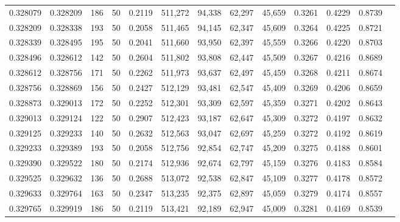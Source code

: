 \begin{tabular}{rrrrrrrrrrrrr}
0.328079 & 0.328209 &   186 &  50 &                                     0.2119 & 511,272 &  94,338 &  62,297 &  45,659 & 0.3261 & 0.4229 & 0.8739 \\
0.328209 & 0.328338 &   193 &  50 &                                     0.2058 & 511,465 &  94,145 &  62,347 &  45,609 & 0.3264 & 0.4225 & 0.8721 \\
0.328339 & 0.328495 &   195 &  50 &                                     0.2041 & 511,660 &  93,950 &  62,397 &  45,559 & 0.3266 & 0.4220 & 0.8703 \\
0.328496 & 0.328612 &   142 &  50 &                                     0.2604 & 511,802 &  93,808 &  62,447 &  45,509 & 0.3267 & 0.4216 & 0.8689 \\
0.328612 & 0.328756 &   171 &  50 &                                     0.2262 & 511,973 &  93,637 &  62,497 &  45,459 & 0.3268 & 0.4211 & 0.8674 \\
0.328756 & 0.328869 &   156 &  50 &                                     0.2427 & 512,129 &  93,481 &  62,547 &  45,409 & 0.3269 & 0.4206 & 0.8659 \\
0.328873 & 0.329013 &   172 &  50 &                                     0.2252 & 512,301 &  93,309 &  62,597 &  45,359 & 0.3271 & 0.4202 & 0.8643 \\
0.329013 & 0.329124 &   122 &  50 &                                     0.2907 & 512,423 &  93,187 &  62,647 &  45,309 & 0.3272 & 0.4197 & 0.8632 \\
0.329125 & 0.329233 &   140 &  50 &                                     0.2632 & 512,563 &  93,047 &  62,697 &  45,259 & 0.3272 & 0.4192 & 0.8619 \\
0.329233 & 0.329389 &   193 &  50 &                                     0.2058 & 512,756 &  92,854 &  62,747 &  45,209 & 0.3275 & 0.4188 & 0.8601 \\
0.329390 & 0.329522 &   180 &  50 &                                     0.2174 & 512,936 &  92,674 &  62,797 &  45,159 & 0.3276 & 0.4183 & 0.8584 \\
0.329525 & 0.329632 &   136 &  50 &                                     0.2688 & 513,072 &  92,538 &  62,847 &  45,109 & 0.3277 & 0.4178 & 0.8572 \\
0.329633 & 0.329764 &   163 &  50 &                                     0.2347 & 513,235 &  92,375 &  62,897 &  45,059 & 0.3279 & 0.4174 & 0.8557 \\
0.329765 & 0.329919 &   186 &  50 &                                     0.2119 & 513,421 &  92,189 &  62,947 &  45,009 & 0.3281 & 0.4169 & 0.8539 \\

\end{tabular}
